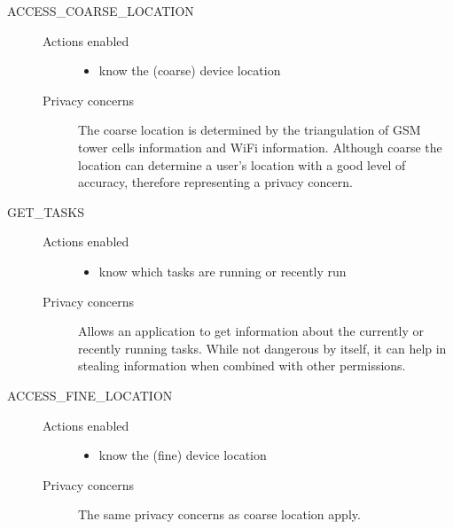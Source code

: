 \documentclass[twoside,letterpaper]{soups}
\theoremstyle{definition}
\begin{document}
\begin{description}
    \item[ACCESS\_COARSE\_LOCATION] \hfill
        \begin{description}
             \item[Actions enabled] \hfill
                \begin{itemize}
                    \item know the (coarse) device location
                 \end{itemize} 
             \item[Privacy concerns]
                The coarse location is determined by the triangulation of GSM tower cells information and WiFi information. Although coarse the location can determine a user's location with a good level of accuracy, therefore representing a privacy concern.                
         \end{description}

    \item[GET\_TASKS] \hfill
        \begin{description}
             \item[Actions enabled] \hfill
                \begin{itemize}
                    \item know which tasks are running or recently run
                 \end{itemize} 
             \item[Privacy concerns]
                Allows an application to get information about the currently or recently running tasks. While not dangerous by itself, it can help in stealing information when combined with other permissions.
         \end{description} 

    \item[ACCESS\_FINE\_LOCATION] \hfill
        \begin{description}
             \item[Actions enabled] \hfill
                \begin{itemize}
                    \item know the (fine) device location
                 \end{itemize} 
             \item[Privacy concerns]
                The same privacy concerns as coarse location apply.
         \end{description} 


\end{description}
\end{document}
